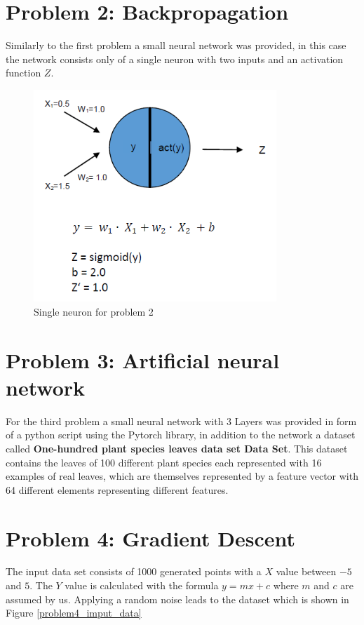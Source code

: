 \section{Problem 2: Backpropagation}
Similarly to the first problem a small neural network was provided, in this case the network consists only of a single neuron with two inputs and an activation function $Z$.
\begin{figure}[t]
	\centering
	\includegraphics[height=8cm]{img/nn_task2.png}
	\caption{Single neuron for problem 2}
    \label{nn_task1}
\end{figure}

\section{Problem 3: Artificial neural network}
For the third problem a small neural network with 3 Layers was provided in form of a python script using the Pytorch library, in addition to the network a dataset called \textbf{One-hundred plant species leaves data set Data Set}. This dataset contains the leaves of 100 different plant species each represented with 16 examples of real leaves, which are themselves represented by a feature vector with 64 different elements representing different features.

\section{Problem 4: Gradient Descent}

The input data set consists of 1000 generated points with a $X$ value between $-5$ and $5$.
The $Y$ value is calculated with the formula $ y = mx + c $ where $m$ and $c$ are assumed by us.
Applying a random noise leads to the dataset which is shown in Figure \ref{problem4_imput_data}

